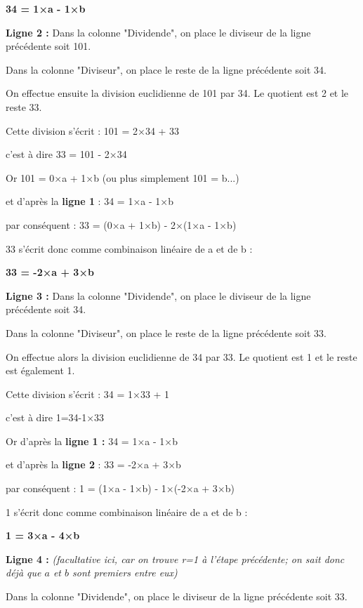 \begin{center}\textbf{34 = 1×a - 1×b}\end{center}
\par
\textbf{Ligne 2 :} Dans la colonne "Dividende", on place le diviseur de la ligne précédente soit 101.
\par
Dans la colonne "Diviseur", on place le reste de la ligne précédente soit 34.
\par
On effectue ensuite la division euclidienne de 101 par 34. Le quotient est 2 et le reste 33.
\par
Cette division s'écrit : 101 = 2×34 + 33
\par
c'est à dire 33 = 101 - 2×34
\par
Or 101 = 0×a + 1×b (ou plus simplement 101 = b...)
\par
et d'après la\textbf{ ligne 1} : 34 = 1×a - 1×b
\par
par conséquent : 33 = (0×a + 1×b) - 2×(1×a - 1×b)
\par
33 s'écrit donc  comme combinaison linéaire de a et de b :
\begin{center}\textbf{33 = -2×a + 3×b}\end{center}
\par
\textbf{Ligne 3 :} Dans la colonne "Dividende", on place le diviseur de la ligne précédente soit 34.
\par
Dans la colonne "Diviseur", on place le reste de la ligne précédente soit 33.
\par
On effectue alors la division euclidienne de 34 par 33. Le quotient est 1 et le reste est également 1.
\par
Cette division s'écrit : 34 = 1×33 + 1
\par
c'est à dire 1=34-1×33
\par
Or d'après la \textbf{ligne 1 :} 34 = 1×a - 1×b
\par
et d'après la \textbf{ligne 2} : 33 = -2×a + 3×b
\par
par conséquent : 1 = (1×a - 1×b) - 1×(-2×a + 3×b)
\par
1 s'écrit donc  comme combinaison linéaire de a et de b :
\begin{center}\textbf{1 = 3×a - 4×b}\end{center}
\par
\textbf{Ligne 4 : }\textit{(facultative ici, car on trouve r=1 à l'étape précédente; on sait donc déjà que $a$ et $b$ sont premiers entre eux)}
\par
Dans la colonne "Dividende", on place le diviseur de la ligne précédente soit 33.
